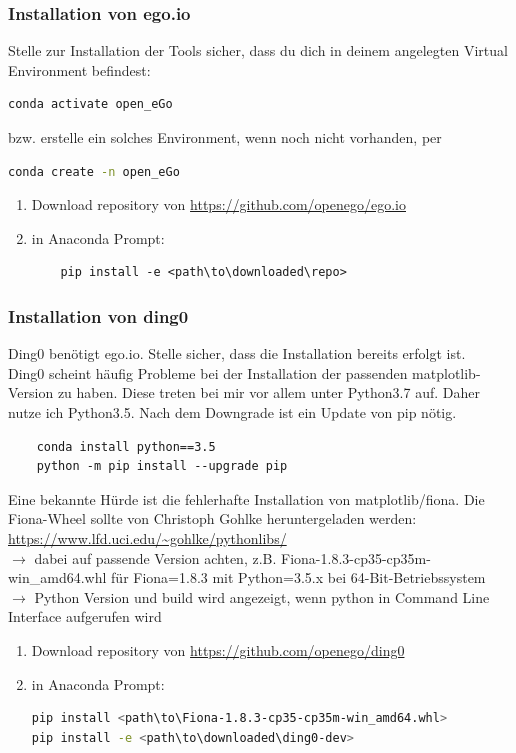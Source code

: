 \documentclass[
a4paper,     %
12pt         %
]{scrartcl}  %
\begin{document}
\subsubsection{Installation von ego.io}
Stelle zur Installation der Tools sicher, dass du dich in deinem angelegten Virtual Environment befindest:
\begin{lstlisting}[language=bash]
	conda activate open_eGo
\end{lstlisting}
bzw. erstelle ein solches Environment, wenn noch nicht vorhanden, per
\begin{lstlisting}[language=bash]
	conda create -n open_eGo
\end{lstlisting}
\begin{enumerate}
	\item Download repository von \url{https://github.com/openego/ego.io}
	\item in Anaconda Prompt:
\begin{lstlisting}
	pip install -e <path\to\downloaded\repo>
\end{lstlisting}
\end{enumerate}

\subsubsection{Installation von ding0}
Ding0 benötigt ego.io. Stelle sicher, dass die Installation bereits erfolgt ist.\\
Ding0 scheint häufig Probleme bei der Installation der passenden matplotlib-Version zu haben. Diese treten bei mir vor allem unter Python3.7 auf. Daher nutze ich Python3.5. Nach dem Downgrade ist ein Update von pip nötig.
\begin{lstlisting}
	conda install python==3.5
	python -m pip install --upgrade pip
\end{lstlisting}

Eine bekannte Hürde ist die fehlerhafte Installation von matplotlib/fiona. Die Fiona-Wheel sollte von Christoph Gohlke heruntergeladen werden: \url{https://www.lfd.uci.edu/~gohlke/pythonlibs/}
\\$\rightarrow$ dabei auf passende Version achten, z.B. Fiona-1.8.3-cp35-cp35m-win\_amd64.whl für Fiona=1.8.3 mit Python=3.5.x bei 64-Bit-Betriebssystem
\\$\rightarrow$ Python Version und build wird angezeigt, wenn python in Command Line Interface aufgerufen wird
\begin{enumerate}
	\item Download repository von \url{https://github.com/openego/ding0}
	\item in Anaconda Prompt:
\begin{lstlisting}[language=bash]
pip install <path\to\Fiona-1.8.3-cp35-cp35m-win_amd64.whl>
pip install -e <path\to\downloaded\ding0-dev>
\end{lstlisting}
\end{enumerate}
\end{document}

